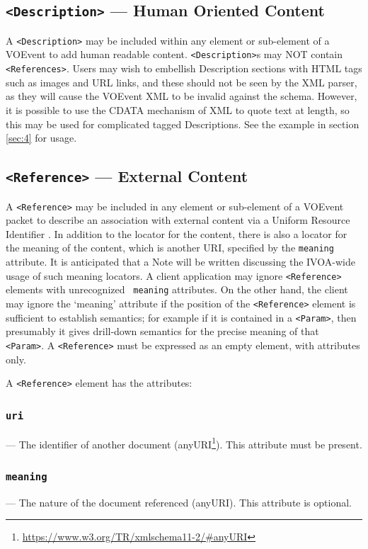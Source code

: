 \documentclass[11pt,a4paper]{ivoa}
\begin{document}
\subsection{{\tt <Description>} --- Human Oriented Content}
\label{sec:3.8}
A {\tt <Description>} may be included within any element or sub-element of a
VOEvent to add human readable content. {\tt <Description>}s may NOT contain {\tt 
<References>}. Users may wish to embellish Description sections with HTML tags 
such as images and URL links, and these should not be seen by the XML parser, as
they will cause the VOEvent XML to be invalid against the schema. However, it is 
possible to use the CDATA mechanism of XML to quote text at length, so this may 
be used for complicated tagged Descriptions. See the example in section 
\ref{sec:4} for usage. 

\subsection{{\tt <Reference>} --- External Content}
\label{sec:3.9}
A {\tt <Reference>} may be included in any element or sub-element of a VOEvent 
packet to describe an association with external content via a Uniform Resource 
Identifier \citep{2016ivoa.spec.0523D}. In addition to the locator for the 
content, there is also a locator for the meaning of the content, which is 
another URI, specified by the {\tt meaning} attribute. It is anticipated that a 
Note will be written discussing the IVOA-wide usage of such meaning locators. A 
client application may ignore {\tt <Reference>} elements with unrecognized {\tt 
meaning} attributes. On the other hand, the client may ignore the `meaning' 
attribute if the position of the {\tt <Reference>} element is sufficient to 
establish semantics; for example if it is contained in a {\tt <Param>}, then 
presumably it gives drill-down semantics for the precise meaning of that {\tt 
<Param>}. A {\tt <Reference>} must be expressed as an empty element, with 
attributes only. 

A {\tt <Reference>} element has the attributes: 
\subsubsection{\tt uri}\label{sec:3.9.1}--- The identifier of another document 
(anyURI\footnote{\url{https://www.w3.org/TR/xmlschema11-2/\#anyURI}}). This 
attribute must be present. 
\subsubsection{\tt meaning}\label{sec:3.9.2}--- The nature of the document 
referenced (anyURI). This attribute is optional. 
\end{document}
